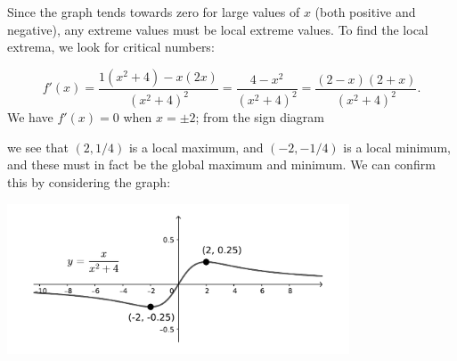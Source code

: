 \documentclass[12pt]{article}
\begin{document}
\begin{enumerate}
Since the graph tends towards zero for large values of $x$ (both positive and negative), any extreme values must be local extreme values. To find the local extrema, we look for critical numbers:

\[
f'(x) = \frac{1(x^2+4)-x(2x)}{(x^2+4)^2} = \frac{4-x^2}{(x^2+4)^2} = \frac{(2-x)(2+x)}{(x^2+4)^2}.
\]
We have $f'(x)=0$ when $x=\pm 2$; from the sign diagram 
\begin{center}
\end{center}
we see that $(2,1/4)$ is a local maximum, and $(-2,-1/4)$ is a local minimum, and these must in fact be the global maximum and minimum. We can confirm this by considering the graph:
\begin{center}
\includegraphics[width=4in]{TT4-fig3}
\end{center}


\end{enumerate}
\end{document}
